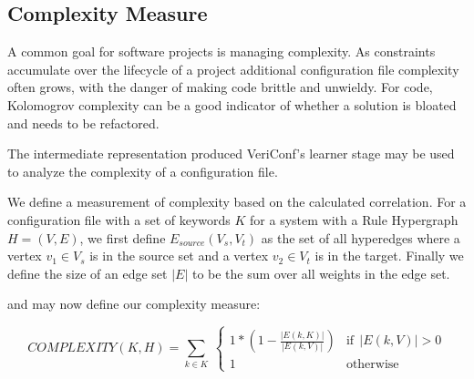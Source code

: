 \iffalse

Intuitively, keywords that are seen together more often with defined relationships are more likely to generate rules within the learner.
 (it would be nice to show this with a quick derivation)

for a rule to be considered *true*, two conditions must hold:

1) adequate support -we have seen the keywords together x number of times

2) adequate confidence - how many times out of the x number of times was the relationship true?

\fi

\iffalse
- Open Questions
> What is the difference between {\it important} rules and
  {\it rules we are more sure about}?

> Why doesn't everything just sum to zero?

\fi
\subsection{Complexity Measure}

A common goal for software projects is managing complexity. As
constraints accumulate over the lifecycle of a project additional
configuration file complexity often grows, with the danger of
making code brittle and unwieldy. For code, Kolomogrov complexity
can be a good indicator of whether a solution is bloated and 
needs to be refactored.

The intermediate representation produced VeriConf's learner stage
may be used to analyze the complexity of a configuration file.


We define a measurement of complexity based on the calculated correlation.
For a configuration file with a set of keywords $K$ for a system
with a Rule Hypergraph $H = (V, E)$, we first define $E_{source}(V_s, V_t)$ as
the set of all hyperedges where a vertex $v_1 \in V_s$ is in the source set and
a vertex $v_2 \in V_t$ is in the target. Finally we define the size
of an edge set $|E|$ to be the sum over all weights in the edge set.

and may now define our complexity measure:

\begin{equation}
    COMPLEXITY(K, H) = \sum_{k \in K} \
        \begin{cases}
            1 * (1 - \frac{|E(k, K)|}{|E(k, V)|}) & \text{if}\ \ |E(k, V)| > 0 \\
            1 & \text{otherwise}
        \end{cases}
\end{equation}

